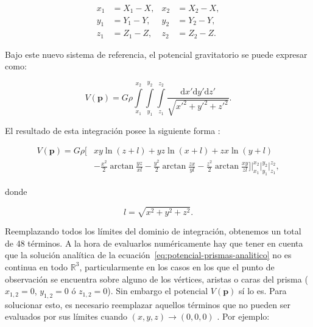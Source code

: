 \begin{equation}
    \begin{aligned}
        x_1 &= X_1 - X, & x_2 &= X_2 - X, \\
        y_1 &= Y_1 - Y, & y_2 &= Y_2 - Y, \\
        z_1 &= Z_1 - Z, & z_2 &= Z_2 - Z.
    \end{aligned}
\end{equation}

Bajo este nuevo sistema de referencia, el potencial gravitatorio se puede
expresar como:

\begin{equation}
    V(\mathbf{p}) =
    G \rho
    \int\limits_{x_1}^{x_2}
    \int\limits_{y_1}^{y_2}
    \int\limits_{z_1}^{z_2}
    \frac{\text{d}x' \text{d}y' \text{d}z'}{\sqrt{{x'}^2 + {y'}^2 + {z'}^2}}.
\end{equation}

El resultado de esta integración posee la siguiente forma
\citep{nagy2000,nagy2002}:

\begin{equation}
    \begin{split}
        V(\mathbf{p}) =
        G \rho
        \Bigg[ &
            xy \ln (z + l) + yz \ln(x + l) + zx \ln(y + l) \\
               &
            - \frac{x^2}{2} \arctan \frac{yz}{xl}
            - \frac{y^2}{2} \arctan \frac{zx}{yl}
            - \frac{z^2}{2} \arctan \frac{xy}{zl}
        \Bigg]
        \Bigg|_{x_1}^{x_2}
        \Bigg|_{y_1}^{y_2}
        \Bigg|_{z_1}^{z_2},
    \end{split}
    \label{eq:potencial-prismas-analitico}
\end{equation}

\noindent donde

\begin{equation}
    l = \sqrt{x^2 + y^2 + z^2}.
\end{equation}

Reemplazando todos los límites del dominio de integración, obtenemos un total
de 48 términos.
A la hora de evaluarlos numéricamente hay que tener en cuenta que la solución
analítica de la ecuación~\ref{eq:potencial-prismas-analitico} no es
continua en todo $\mathbb{R}^3$, particularmente en los casos en los que el
punto de observación se encuentra sobre alguno de los vértices, aristas o caras
del prisma ($x_{1,2}=0$, $y_{1,2}=0$ ó $z_{1,2}=0$). Sin embargo el potencial
$V(\mathbf{p})$ sí lo es.
Para solucionar esto, es necesario reemplazar aquellos términos que no pueden
ser evaluados por sus límites cuando $(x, y, z) \rightarrow (0, 0, 0)$
\citep{nagy2000}.
Por ejemplo:

